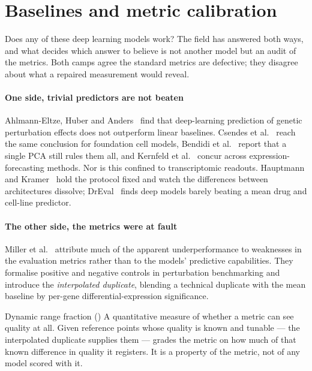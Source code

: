 \section{Baselines and metric calibration}
\label{sec:lit-dispute}
\framedecl{-}

\begin{question}
Does any of these deep learning models work? The field has answered both ways, and what decides which
answer to believe is not another model but an audit of the metrics. Both camps
agree the standard metrics are defective; they disagree about what a repaired
measurement would reveal.
\end{question}

\paragraph{One side, trivial predictors are not beaten}
Ahlmann-Eltze, Huber and Anders~\cite{ahlmanneltze} find that deep-learning
prediction of genetic perturbation effects does not outperform linear baselines.
Csendes et al.~\cite{csendes} reach the same conclusion for foundation cell
models, Bendidi et al.~\cite{bendidi} report that a single PCA still rules them
all, and Kernfeld et al.~\cite{kernfeld} concur across expression-forecasting
methods. Nor is this confined to transcriptomic readouts. Hauptmann and
Kramer~\cite{hauptmann} hold the protocol fixed and watch the differences between
architectures dissolve; DrEval~\cite{dreval} finds deep models barely beating a
mean drug and cell-line predictor.

\paragraph{The other side, the metrics were at fault} Miller et
al.~\cite{miller} attribute much of the apparent underperformance to weaknesses
in the evaluation metrics rather than to the models' predictive capabilities.
They formalise positive
and negative controls in perturbation benchmarking and introduce the
\emph{interpolated duplicate}, blending a technical duplicate with the mean
baseline by per-gene differential-expression
significance.

\begin{defn}{Dynamic range fraction (\DRF)}
A quantitative measure of whether a metric can see quality at all. Given
reference points whose quality is known and tunable --- the interpolated
duplicate supplies them --- \DRF{} grades the metric on how much of that known
difference in quality it registers. It is a property of the metric, not of any
model scored with it.
\end{defn}

